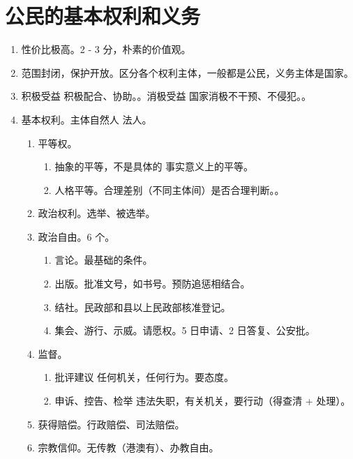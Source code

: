 \section{公民的基本权利和义务}
\begin{enumerate}
  \item 性价比极高。2 - 3 分，朴素的价值观。
  \item 范围封闭，保护开放。区分各个权利主体，一般都是公民，义务主体是国家。
  \item 积极受益 \yjt 积极配合、协助。。消极受益 \yjt 国家消极不干预、不侵犯。。
  \item 基本权利。主体自然人 \hz 法人。
        \begin{enumerate}
          \item 平等权。
                \begin{enumerate}
                  \item 抽象的平等，不是具体的 \hz 事实意义上的平等。
                  \item 人格平等。合理差别（不同主体间）是否合理判断。。
                \end{enumerate}
          \item 政治权利。选举、被选举。
          \item 政治自由。6 个。
                \begin{enumerate}
                  \item 言论。最基础的条件。
                  \item 出版。批准文号，如书号。预防追惩相结合。
                  \item 结社。民政部和县以上民政部核准登记。
                  \item 集会、游行、示威。请愿权。5 日申请、2 日答复、公安批。
                \end{enumerate}
          \item 监督。
                \begin{enumerate}
                  \item 批评建议 \yjt 任何机关，任何行为。要态度。
                  \item 申诉、控告、检举 \yjt 违法失职，有关机关，要行动（得查清 + 处理）。
                \end{enumerate}
          \item 获得赔偿。行政赔偿、司法赔偿。
          \item 宗教信仰。无传教（港澳有）、办教自由。
                \begin{enumerate}

\end{enumerate}
\end{enumerate}
\end{enumerate}
